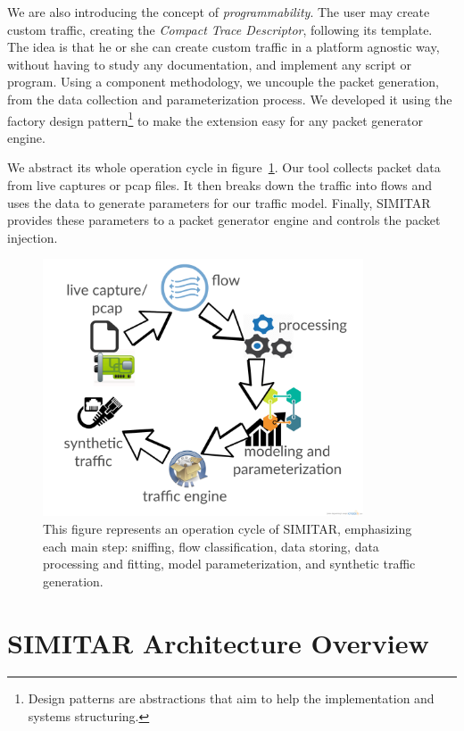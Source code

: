 We are also introducing the concept of \textit{programmability}. The user may create custom traffic, creating the \textit{Compact Trace Descriptor}, following its template. The idea is that he or she can create custom traffic in a platform agnostic way, without having to study any documentation, and implement any script or program.  Using a component methodology, we uncouple the packet generation, from the data collection and parameterization process. We developed it using the factory design pattern\footnote{Design patterns are abstractions that aim to help the implementation and systems structuring\cite{web-design-patterns}.} to make the extension easy for any packet generator engine. 

We abstract its whole operation cycle in figure~\ref{fig:cycle-of-operation}. Our tool collects packet data from live captures or pcap files. It then breaks down the traffic into flows and uses the data to generate parameters for our traffic model. Finally, SIMITAR provides these parameters to a packet generator engine and controls the packet injection.

\begin{figure}[ht!]
        \centering
        \includegraphics[height=3.0in]{figures/ch3/digram-project-cycle}
        \caption{This figure represents an operation cycle of SIMITAR, emphasizing each main step: sniffing, flow classification, data storing, data processing and fitting, model parameterization,  and synthetic traffic generation.}
    \label{fig:cycle-of-operation}
\end{figure}

\section{SIMITAR Architecture Overview}

